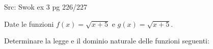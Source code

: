 \begin{questions}
\begin{qblock}
\begin{parts}
        \end{parts}

        \begin{profonly}	Src: Swok ex 3 pg 226/227	\end{profonly}
    \end{qblock}


    \begin{qblock}
        \question
        \exonly
        {
            Date le funzioni $f(x)=\sqrt{x+5}$ e  $g(x)=\sqrt{x+5}$.

            Determinare la legge e il dominio naturale delle funzioni seguenti:
        }

\end{qblock}
\end{questions}
